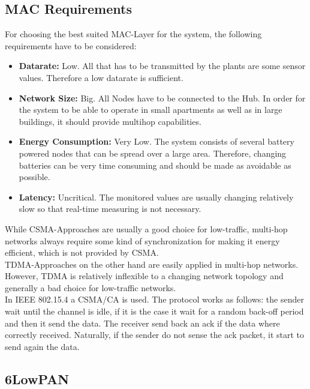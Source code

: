 \subsection{MAC Requirements}
For choosing the best suited MAC-Layer for the system, the following requirements have to be considered:

\begin{itemize}
	\item \textbf{Datarate:}
	Low. All that has to be transmitted by the plants are some sensor values. Therefore a low datarate is sufficient.
	\item \textbf{Network Size:}
	Big. All Nodes have to be connected to the Hub. In order for the system to be able to operate in small apartments as well as in large buildings, it should provide multihop capabilities.
	\item \textbf{Energy Consumption:}
	Very Low. The system consists of several battery powered nodes that can be spread over a large area. Therefore, changing batteries can be very time consuming and should be made as avoidable as possible.
	\item \textbf{Latency:}
	Uncritical. The monitored values are usually changing relatively slow so that real-time measuring is not necessary.
\end{itemize}

While CSMA-Approaches are usually a good choice for low-traffic, multi-hop networks always require some kind of synchronization for making it energy efficient, which is not provided by CSMA.\\
TDMA-Approaches on the other hand are easily applied in multi-hop networks. However, TDMA is relatively inflexible to a changing network topology and generally a bad choice for low-traffic networks.\\
In IEEE 802.15.4 a CSMA/CA is used. The protocol works as follows:
the sender wait until the channel is idle, if it is the case it wait for a random back-off period and then it send the data. The receiver send back an ack if the data where correctly received. Naturally, if the sender do not sense the ack packet, it start to send again the data.\cite{slide}\\





\subsection{6LowPAN}


